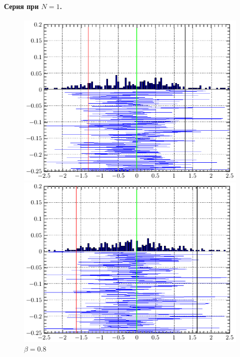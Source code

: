 \documentclass[a4paper,14pt]{extarticle}
\begin{document}
\paragraph{Серия при $N=1$.} \hphantom{asasfsd}
\begin{figure}[H]
\begin{minipage}{0.3\linewidth}
    \centering
    \includegraphics[width=\linewidth]{fig/gist_n1_b80.pdf}
    \vspace{-1em}
    \caption{$\beta =0.8$}
\end{minipage}
\begin{minipage}{0.3\linewidth}
    \centering
    \includegraphics[width=\linewidth]{fig/gist_n1_b95.pdf}
    \vspace{-1em}

\end{minipage}
\end{figure}
\end{document}
